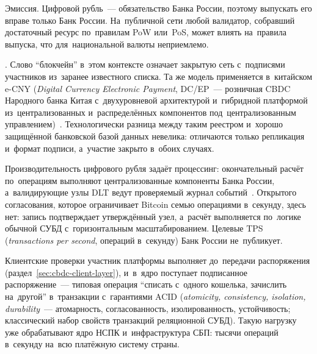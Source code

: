Эмиссия. Цифровой рубль~--- обязательство Банка России, поэтому выпускать его
вправе только Банк России. На~публичной сети любой валидатор, собравший
достаточный ресурс по~правилам PoW или~PoS, может влиять на~правила выпуска,
что для~национальной валюты неприемлемо.

. Слово \enquote{блокчейн} в~этом контексте означает
закрытую сеть с~подписями участников из~заранее известного списка. Та же модель
применяется в~китайском e-CNY (\textit{Digital Currency Electronic Payment},
  DC/EP~--- розничная CBDC Народного банка Китая с~двухуровневой архитектурой
  и~гибридной платформой из~централизованных и~распределённых компонентов
под~централизованным управлением)~\cite{pboc-ecny-2021}. Технологически разница
между таким реестром и~хорошо защищённой банковской базой данных невелика:
отличаются только репликация и~формат подписи, а~участие закрыто в~обоих
случаях.

Производительность цифрового рубля задаёт процессинг: окончательный расчёт
по~операциям выполняют централизованные компоненты Банка России, а~валидирующие
узлы DLT ведут проверяемый журнал событий~\cite{cbr-concept-2021}. Открытого
согласования, которое ограничивает Bitcoin семью операциями в~секунду, здесь
нет: запись подтверждает утверждённый узел, а~расчёт выполняется по~логике
обычной СУБД с~горизонтальным масштабированием. Целевые TPS (\textit{transactions
per second}, операций в~секунду) Банк России не~публикует.

Клиентские проверки участник платформы выполняет до~передачи распоряжения
(раздел~\ref{sec:cbdc-client-layer}), и~в~ядро поступает подписанное
распоряжение~--- типовая операция \enquote{списать
с~одного кошелька, зачислить на~другой} в~транзакции с~гарантиями ACID
(\textit{atomicity, consistency, isolation, durability}~--- атомарность,
  согласованность, изолированность, устойчивость; классический набор свойств
транзакций реляционной СУБД). Такую нагрузку уже обрабатывают ядро НСПК
и~инфраструктура СБП: тысячи операций в~секунду на~всю платёжную
систему страны.

